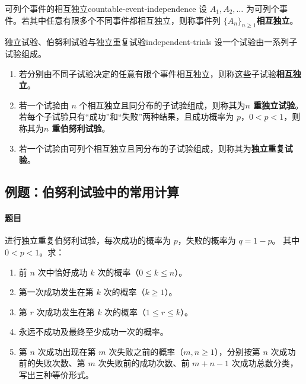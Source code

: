 \begin{mydefinition}{可列个事件的相互独立}{countable-event-independence}
设 $A_1,A_2,\ldots$ 为可列个事件。若其中任意有限多个不同事件都相互独立，则称事件列 $\{A_n\}_{n\geq1}$\textbf{相互独立}。
\end{mydefinition}

\begin{mydefinition}{独立试验、伯努利试验与独立重复试验}{independent-trials}
设一个试验由一系列子试验组成。
\begin{enumerate}
    \item 若分别由不同子试验决定的任意有限个事件相互独立，则称这些子试验\textbf{相互独立}。
    \item 若一个试验由 $n$ 个相互独立且同分布的子试验组成，则称其为\textbf{$n$ 重独立试验}。若每个子试验只有“成功”和“失败”两种结果，且成功概率为 $p$，$0<p<1$，则称其为\textbf{$n$ 重伯努利试验}。
    \item 若一个试验由可列个相互独立且同分布的子试验组成，则称其为\textbf{独立重复试验}。
\end{enumerate}
\end{mydefinition}

\subsection{例题：伯努利试验中的常用计算}\label{note:c1:e27}
\paragraph{题目}
进行独立重复伯努利试验，每次成功的概率为 $p$，失败的概率为 $q=1-p$。
其中 $0<p<1$。求：
\begin{enumerate}
\item 前 $n$ 次中恰好成功 $k$ 次的概率（$0\leq k\leq n$）。
\item 第一次成功发生在第 $k$ 次的概率（$k\geq1$）。
\item 第 $r$ 次成功发生在第 $k$ 次的概率（$1\leq r\leq k$）。
\item 永远不成功及最终至少成功一次的概率。
\item 第 $n$ 次成功出现在第 $m$ 次失败之前的概率（$m,n\geq1$），分别按第 $n$ 次成功前的失败次数、第 $m$ 次失败前的成功次数、前 $m+n-1$ 次成功总数分类，写出三种等价形式。
\end{enumerate}

